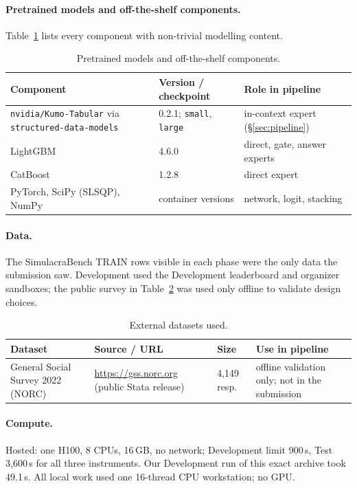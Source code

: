 \documentclass{article}
\begin{document}
\paragraph{Pretrained models and off-the-shelf components.} Table~\ref{tab:models} lists every component with non-trivial modelling content.
\begin{table}[h]
  \centering
  \small
  \caption{Pretrained models and off-the-shelf components.}
  \label{tab:models}
  \begin{tabular}{lll}
    \toprule
    Component & Version / checkpoint & Role in pipeline  \\
    \midrule
    \texttt{nvidia/Kumo-Tabular} via \texttt{structured-data-models} & 0.2.1; \texttt{small}, \texttt{large} & in-context expert (\S\ref{sec:pipeline}) \\
    LightGBM & 4.6.0 & direct, gate, answer experts \\
    CatBoost & 1.2.8 & direct expert \\
    PyTorch, SciPy (SLSQP), NumPy & container versions & network, logit, stacking \\
    \bottomrule
  \end{tabular}
\end{table}

\paragraph{Data.} The SimulacraBench TRAIN rows visible in each phase were the only data the submission saw. Development used the Development leaderboard and organizer sandboxes; the public survey in Table~\ref{tab:external} was used only offline to validate design choices.

\begin{table}[h]
  \centering
  \small
  \caption{External datasets used.}
  \label{tab:external}
  \begin{tabular}{p{2.6cm}p{4.8cm}p{1.8cm}p{3.4cm}}
    \toprule
    Dataset & Source / URL & Size & Use in pipeline \\
    \midrule
    General Social Survey 2022 (NORC) & \url{https://gss.norc.org} (public Stata release) & 4,149 resp. & offline validation only; not in the submission \\
    \bottomrule
  \end{tabular}
\end{table}

\paragraph{Compute.} Hosted: one H100, 8 CPUs, 16\,GB, no network; Development limit 900\,s, Test 3,600\,s for all three instruments. Our Development run of this exact archive took 49.1\,s. All local work used one 16-thread CPU workstation; no GPU.
\end{document}
